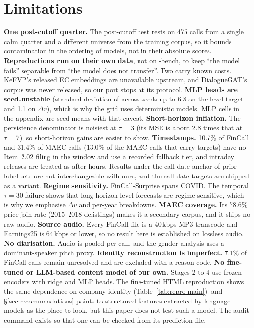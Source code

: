 \section*{Limitations}

\textbf{One post-cutoff quarter.} The post-cutoff test rests on 475 calls from a
single calm quarter and a different universe from the training corpus, so it
bounds contamination in the ordering of models, not in their absolute scores.
\textbf{Reproductions run on their own data}, not on \ecvol-bench, to keep ``the
model fails'' separable from ``the model does not transfer''. Two carry known
costs. KeFVP's released EC embeddings are unavailable upstream, and DialogueGAT's
corpus was never released, so our port stops at its protocol. \textbf{MLP heads
are seed-unstable} (standard deviation of \Rtwo{} across seeds up to 6.8 on the
level target and 1.1 on $\Delta v$), which is why the grid uses deterministic
models. MLP cells in the appendix are seed means with that caveat.
\textbf{Short-horizon \Rtwo{} inflation.} The persistence denominator is noisiest
at $\tau{=}3$ (its MSE is about 2.8 times that at $\tau{=}7$), so short-horizon
gains are easier to show. \textbf{Timestamps.} 10.7\% of FinCall and 31.4\% of
MAEC calls (13.0\% of the MAEC calls that carry targets) have no Item~2.02 filing
in the window and use a recorded fallback tier, and intraday releases are treated
as after-hours. Results under the
call-date anchor of prior label sets are not interchangeable with ours, and the
call-date targets are shipped as a variant. \textbf{Regime sensitivity.}
FinCall-Surprise spans COVID. The temporal $\tau{=}30$ failure shows that
long-horizon level forecasts are regime-sensitive, which is why we emphasise
$\Delta v$ and per-year breakdowns. \textbf{MAEC coverage.} Its 78.6\% price-join
rate (2015--2018 delistings) makes it a secondary corpus, and it ships no raw
audio. \textbf{Source audio.} Every FinCall file is a 40\,kbps MP3 transcode and
Earnings25 is 64\,kbps or lower, so no result here is established on lossless
audio. \textbf{No diarisation.} Audio is pooled per call, and the gender analysis
uses a dominant-speaker pitch proxy. \textbf{Identity reconstruction is
imperfect.} 7.1\% of FinCall calls remain unresolved and are excluded with a
reason code. \textbf{No fine-tuned or LLM-based content model of our own.}
Stages 2 to 4 use frozen encoders with ridge and MLP heads. The fine-tuned HTML
reproduction shows the same dependence on company identity
(Table~\ref{tab:repro-main}), and \S\ref{sec:recommendations} points to
structured features extracted by language models as the place to look, but this
paper does not test such a model. The audit command exists so that one can be
checked from its prediction file.
